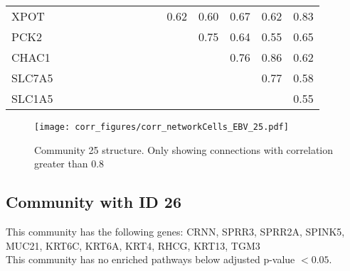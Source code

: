 \begin{longtable}{lrrrrrrrrrrrrrr}
XPOT    &               &            &            &             &            &              &             &            &            &       0.62 &        0.60 &         0.67 &         0.62 &         0.83 \\
PCK2    &               &            &            &             &            &              &             &            &            &            &        0.75 &         0.64 &         0.55 &         0.65 \\
CHAC1   &               &            &            &             &            &              &             &            &            &            &             &         0.76 &         0.86 &         0.62 \\
SLC7A5  &               &            &            &             &            &              &             &            &            &            &             &              &         0.77 &         0.58 \\
SLC1A5  &               &            &            &             &            &              &             &            &            &            &             &              &              &         0.55 \\
\end{longtable}


\begin{figure}[h!]
\centering
\texttt{[image: corr\_figures/corr\_networkCells\_EBV\_25.pdf]}
\caption{Community 25 structure. Only showing connections with correlation greater than 0.8}
\end{figure}




\subsection*{Community with ID 26}
This community has the following genes: CRNN, SPRR3, SPRR2A, SPINK5, MUC21, KRT6C, KRT6A, KRT4, RHCG, KRT13, TGM3
\\
This community has no enriched pathways below adjusted p-value $< 0.05$.

